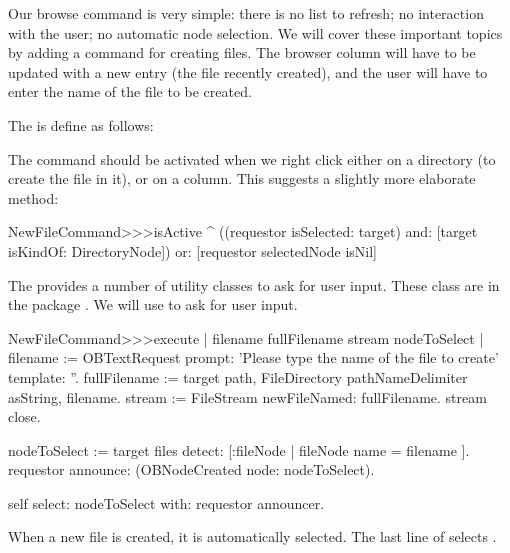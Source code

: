 \documentclass[a4paper,10pt,twoside]{book}
\begin{document}
Our browse command is very simple: there is no list to refresh; no interaction with the user; no automatic node selection. We will cover these important topics by adding a command for creating files. The browser column will have to be updated with a new entry (the file recently created), and the user will have to enter the name of the file to be created.

The  is define as follows:


The command should be activated when we right click either on a directory (to create the file in it), or on a column. This suggests a slightly more elaborate  method:

\begin{code}{}    
NewFileCommand>>>isActive
	^ ((requestor isSelected: target) and: [target isKindOf: DirectoryNode])
			or: [requestor selectedNode isNil]
\end{code}

The \obf provides a number of utility classes to ask for user input. These class are in the package . We will use  to ask for user input. 

\begin{code}{}    
NewFileCommand>>>execute
	| filename fullFilename stream nodeToSelect |
	filename := OBTextRequest 
					prompt: 'Please type the name of the file to create' 
					template: ''.
	fullFilename := target path, FileDirectory pathNameDelimiter asString, filename.
	stream := FileStream newFileNamed: fullFilename.
	stream close.

	nodeToSelect := target files detect: [:fileNode | fileNode name = filename ].
	requestor announce: (OBNodeCreated node: nodeToSelect).

	self select: nodeToSelect with: requestor announcer.
\end{code}

When a new file is created, it is automatically selected. The last line of  selects .
\end{document}
